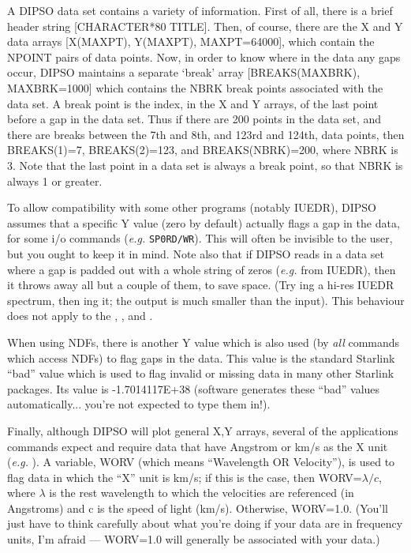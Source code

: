 A DIPSO data set contains a variety of information. First of all,
there is a brief header string [CHARACTER*80 TITLE]. Then, of course,
there are the X and Y data arrays [X(MAXPT), Y(MAXPT), MAXPT=64000],
which contain the NPOINT pairs of data points. Now, in order to know
where in the data any gaps occur, DIPSO maintains a separate `break'
array [BREAKS(MAXBRK), MAXBRK=1000] which contains the NBRK break
points associated with the data set. A break point is the index, in the
X and Y arrays, of the last point before a gap in the data set. Thus
if there are 200 points in the data set, and there are breaks between
the 7th and 8th, and 123rd and 124th, data points, then BREAKS(1)=7,
BREAKS(2)=123, and BREAKS(NBRK)=200, where NBRK is 3. Note that the
last point in a data set is always a break point, so that NBRK is
always 1 or greater.

To allow compatibility with some other programs (notably IUEDR), DIPSO
assumes that a specific Y value (zero by default) actually flags a gap
in the data, for some i/o commands ({\em e.g.} {\tt{SP0RD/WR}}).  This
will often be invisible to the user, but you ought to keep it in mind.
Note also that if DIPSO reads in a data set where a gap is padded out
with a whole string of zeros ({\em e.g.} from IUEDR), then it throws
away all but a couple of them, to save space. (Try ing  a
hi-res IUEDR spectrum, then ing  it; the output is much
smaller than the input). This behaviour does not apply to the , 
,    and . 

When using NDFs, there is another Y value which is also used (by {\em
all} commands which access NDFs) to flag gaps in the data. This value is
the standard Starlink ``bad'' value which is used to flag invalid or
missing data in many other Starlink packages. Its value is -1.7014117E+38
(software generates these ``bad'' values automatically... you're not
expected to type them in!).

Finally, although DIPSO will plot general X,Y arrays, several of the
applications commands expect and require data that have Angstrom or
km/s as the X unit ({\em e.g.} ).  A variable,
WORV (which means
``Wavelength OR Velocity''), is used to flag data in which the ``X''
unit is km/s; if this is the case, then WORV=$\lambda/c$, where
$\lambda$ is the rest wavelength to which the velocities are
referenced (in Angstroms) and c is the speed of light (km/s).
Otherwise, WORV=1.0. (You'll just have to think carefully about what
you're doing if your data are in frequency units, I'm afraid ---
WORV=1.0 will generally be associated with your data.)

